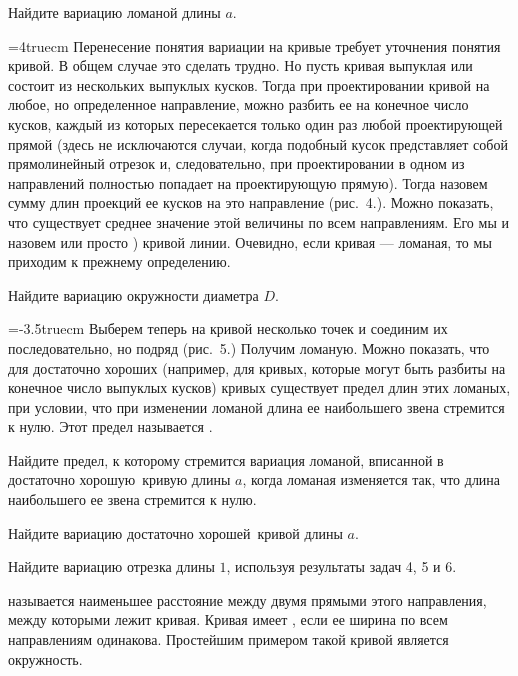 \documentclass[a4paper,10pt]{article}
\begin{document}
Найдите вариацию ломаной длины $a$.

\hangindent=4truecm
Перенесение понятия вариации на кривые требует уточнения понятия кривой.
В общем случае это сделать трудно. Но пусть кривая выпуклая или состоит
из нескольких выпуклых кусков. Тогда при проектировании кривой на любое,
но определенное направление, можно разбить ее на конечное число кусков,
каждый из которых пересекается только один раз любой
проектирующей прямой (здесь не исключаются случаи, когда подобный кусок
представляет собой прямолинейный отрезок и, следовательно, при
проектировании в одном из направлений полностью попадает на
проектирующую прямую).  Тогда  назовем сумму длин проекций ее кусков на это направление
(рис.~4.). Можно показать, что существует среднее значение этой величины
по всем направлениям. Его мы и назовем
 или просто ) кривой линии.
Очевидно, если кривая --- ломаная,
то мы приходим к прежнему определению.

Найдите вариацию окружности диаметра $D$.

\hangindent=-3.5truecm
Выберем теперь на кривой несколько точек и соединим их последовательно,
но подряд (рис.~5.) Получим ломаную. Можно показать, что для достаточно
хороших (например, для кривых, которые могут быть разбиты на
конечное число выпуклых кусков) кривых существует предел длин
этих ломаных, при условии, что при изменении ломаной длина ее наибольшего
звена стремится к нулю. Этот предел называется .



Найдите предел, к которому стремится вариация ломаной, вписанной в
 достаточно хорошую\ кривую длины $a$, когда ломаная изменяется
так, что длина наибольшего ее звена стремится к нулю.

Найдите вариацию  достаточно хорошей\ кривой длины $a$.

Найдите %
вариацию отрезка длины $1$,
используя результаты задач 4, 5 и 6.


 называется наименьшее
расстояние между двумя прямыми этого направления, между которыми
лежит кривая.
Кривая имеет , если ее ширина по всем направлениям
одинакова.
Простейшим примером такой кривой %
является окружность.
\end{document}
